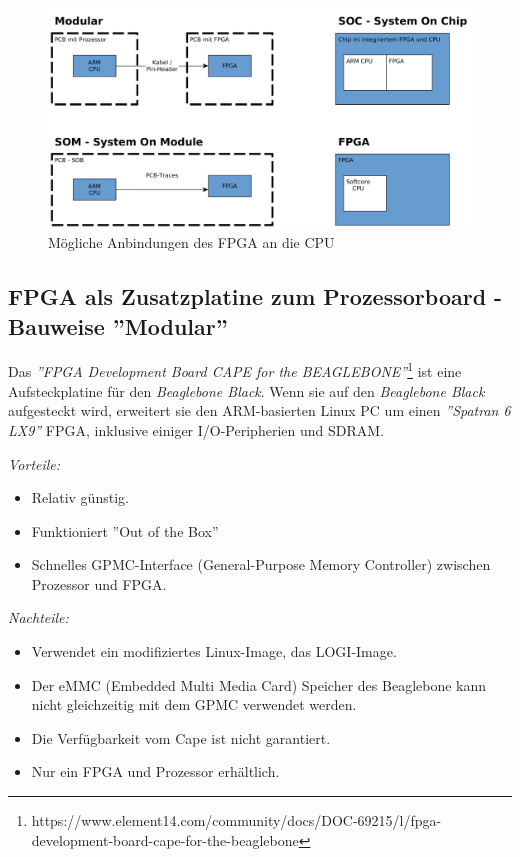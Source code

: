 \begin{figure}[htbp]
	\centering
		\includegraphics[width=\textwidth,height=\textheight,keepaspectratio]{graphs/bauformen.png}
	\caption[]{Mögliche Anbindungen des FPGA an die CPU}
	\label{fig:anbindungFPG}
\end{figure}


\subsection{FPGA als Zusatzplatine zum Prozessorboard - Bauweise ''Modular''}
Das \textit{''FPGA Development Board CAPE for the BEAGLEBONE''}\footnote{https://www.element14.com/community/docs/DOC-69215/l/fpga-development-board-cape-for-the-beaglebone} ist eine Aufsteckplatine für den \textit{Beaglebone Black}.
Wenn sie auf den \textit{Beaglebone Black} aufgesteckt wird, erweitert sie den ARM-basierten Linux PC um einen \textit{''Spatran 6 LX9''} FPGA, inklusive einiger I/O-Peripherien und SDRAM.

\textit{Vorteile:}
\begin{itemize}
	\item Relativ günstig.
	\item Funktioniert ''Out of the Box''
	\item Schnelles GPMC-Interface (General-Purpose Memory Controller) zwischen Prozessor und FPGA.
\end{itemize}

\textit{Nachteile:}
\begin{itemize}
	\item Verwendet ein modifiziertes Linux-Image, das LOGI-Image.
	\item Der eMMC (Embedded Multi Media Card) Speicher des Beaglebone kann nicht gleichzeitig mit dem GPMC verwendet werden.
	\item Die Verfügbarkeit vom Cape ist nicht garantiert.
	\item Nur ein FPGA und Prozessor erhältlich.
\end{itemize}

